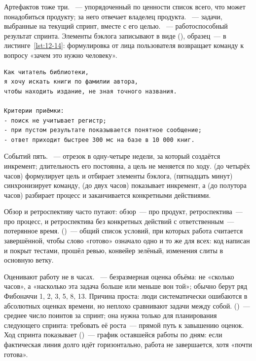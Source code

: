 Артефактов тоже три. ~--- упорядоченный по ценности список всего, что может понадобиться продукту; за него отвечает владелец продукта. ~--- задачи, выбранные на текущий спринт, вместе с его целью. ~--- работоспособный результат спринта. Элементы бэклога записывают в виде  (), образец~--- в листинге~\ref{lst:12-14}: формулировка от лица пользователя возвращает команду к вопросу «зачем это нужно человеку».

\begin{listing}[H]
\begin{verbatim}
Как читатель библиотеки,
я хочу искать книги по фамилии автора,
чтобы находить издание, не зная точного названия.

Критерии приёмки:
- поиск не учитывает регистр;
- при пустом результате показывается понятное сообщение;
- ответ приходит быстрее 300 мс на базе в 10 000 книг.
\end{verbatim}
\caption{Пользовательская история с критериями приёмки}
\label{lst:12-14}
\end{listing}

Событий пять. ~--- отрезок в одну-четыре недели, за который создаётся инкремент; длительность его постоянна, а цель не меняется по ходу.  (до четырёх часов) формулирует цель и отбирает элементы бэклога,  (пятнадцать минут) синхронизирует команду,  (до двух часов) показывает инкремент, а  (до полутора часов) разбирает процесс и заканчивается конкретными действиями.

Обзор и ретроспективу часто путают: обзор~--- про продукт, ретроспектива~--- про процесс, и ретроспектива без конкретных действий с ответственным~--- потерянное время.  ()~--- общий список условий, при которых работа считается завершённой, чтобы слово «готово» означало одно и то же для всех: код написан и покрыт тестами, прошёл ревью, конвейер зелёный, изменения слиты в основную ветку.

Оценивают работу не в часах. ~--- безразмерная оценка объёма: не «сколько часов», а «насколько эта задача больше или меньше вон той»; обычно берут ряд Фибоначчи 1, 2, 3, 5, 8, 13. Причина проста: люди систематически ошибаются в абсолютных оценках времени, но неплохо сравнивают задачи между собой.  ()~--- среднее число поинтов за спринт; она нужна только для планирования следующего спринта: требовать её роста~--- прямой путь к завышению оценок. Ход спринта показывает  ()~--- график оставшейся работы по дням: если фактическая линия долго идёт горизонтально, работа не завершается, хотя «почти готова».

